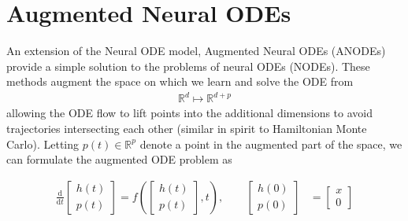 \documentclass[book.tex]{subfiles}
\begin{document}

\section{Augmented Neural ODEs}

An extension of the Neural ODE model, Augmented Neural ODEs (ANODEs) provide a simple solution to the problems of neural ODEs (NODEs). These methods augment the space on which we learn and solve the ODE from 
\begin{align}
\mathbb{R}^d \mapsto \mathbb{R}^{d+p}
\end{align}
allowing the ODE flow to lift points into the additional dimensions to avoid trajectories intersecting each other (similar in spirit to Hamiltonian Monte Carlo). Letting $p(t) \in \mathbb{R}^p$ denote a point in the augmented part of the space, we can formulate the augmented ODE problem as

\begin{align}
\frac{\mathrm{d}}{\mathrm{d}t} \begin{bmatrix} h(t) \\ p(t) \end{bmatrix} = f \left (\begin{bmatrix} h(t) \\ 
p(t) \end{bmatrix}, t\right ), \qquad \begin{bmatrix} h(0) \\ 
p(0) \end{bmatrix} &= \begin{bmatrix} x \\ 0 \end{bmatrix}
\end{align}
\end{document}
